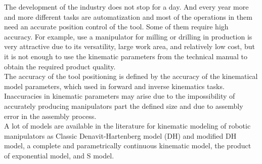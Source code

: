 The development of the industry does not stop for a day. And every year more and more different tasks are automatization and most of the operations in them need an accurate position control of the tool. Some of them require high accuracy. For example, use a manipulator for milling or drilling in production is very attractive due to its versatility, large work area, and relatively low cost, but it is not enough to use the kinematic parameters from the technical manual to obtain the required product quality.\\


The accuracy of the tool positioning is defined by the accuracy of the kinematical model parameters, which used in forward and inverse kinematics tasks. Inaccuracies in kinematic parameters may arise due to the impossibility of accurately producing manipulators part the defined size and due to assembly error in the assembly process.\\


A lot of models are available in the literature for kinematic modeling of robotic manipulators as Classic Denavit-Hartenberg model (DH) and modified DH model,  a complete and parametrically continuous kinematic model, the product of exponential model, and S model.\\
